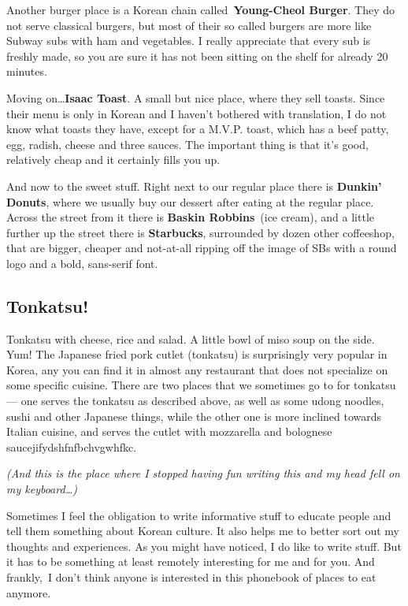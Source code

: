 \begin{post}
\begin{content}
Another burger place is a Korean chain called \textbf{Young-Cheol Burger}. They do not serve classical burgers, but most of their so called burgers are more like Subway subs with ham and vegetables. I really appreciate that every sub is freshly made, so you are sure it has not been sitting on the shelf for already 20 minutes.

Moving on{\ldots}\textbf{Isaac Toast}. A small but nice place, where they sell toasts. Since their menu is only in Korean and I haven't bothered with translation, I do not know what toasts they have, except for a M.V.P. toast, which has a beef patty, egg, radish, cheese and three sauces. The important thing is that it's good, relatively cheap and it certainly fills you up.

And now to the sweet stuff. Right next to our regular place there is \textbf{Dunkin' Donuts}, where we usually buy our dessert after eating at the regular place. Across the street from it there is \textbf{Baskin Robbins} (ice cream), and a little further up the street there is \textbf{Starbucks}, surrounded by dozen other coffeeshop, that are bigger, cheaper and not-at-all ripping off the image of SBs with a round logo and a bold, sans-serif font.

\subsection{Tonkatsu!}
Tonkatsu with cheese, rice and salad. A little bowl of miso soup on the side. Yum! The Japanese fried pork cutlet (tonkatsu) is surprisingly very popular in Korea, any you can find it in almost any restaurant that does not specialize on some specific cuisine. There are two places that we sometimes go to for tonkatsu --- one serves the tonkatsu as described above, as well as some udong noodles, sushi and other Japanese things, while the other one is more inclined towards Italian cuisine, and serves the cutlet with mozzarella and bolognese saucejifydshfnfbchvgwhfkc.

\textit{(And this is the place where I stopped having fun writing this and my head fell on my keyboard{\ldots})}

Sometimes I feel the obligation to write informative stuff to educate people and tell them something about Korean culture. It also helps me to better sort out my thoughts and experiences. As you might have noticed, I do like to write stuff. But it has to be something at least remotely interesting for me and for you. And frankly, I don't think anyone is interested in this phonebook of places to eat anymore.


\end{content}
\end{post}
